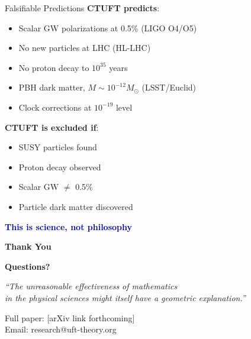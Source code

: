 \documentclass[aspectratio=169]{beamer}
\begin{document}
\begin{frame}{Falsifiable Predictions}
\textbf{CTUFT predicts}:
\begin{itemize}
    \item Scalar GW polarizations at 0.5\% (LIGO O4/O5)
    \item No new particles at LHC (HL-LHC)
    \item No proton decay to $10^{35}$ years
    \item PBH dark matter, $M \sim 10^{-12} M_\odot$ (LSST/Euclid)
    \item Clock corrections at $10^{-19}$ level
\end{itemize}

\vspace{0.5cm}

\textbf{CTUFT is excluded if}:
\begin{itemize}
    \item SUSY particles found
    \item Proton decay observed
    \item Scalar GW $\neq$ 0.5\%
    \item Particle dark matter discovered
\end{itemize}

\vspace{0.5cm}
\begin{center}
\textcolor{darkblue}{\textbf{This is science, not philosophy}}
\end{center}
\end{frame}

\begin{frame}
\begin{center}
\Huge
\textbf{Thank You}

\vspace{1cm}

\normalsize
\textbf{Questions?}

\vspace{1cm}

\textit{``The unreasonable effectiveness of mathematics\\
in the physical sciences might itself have a geometric explanation.''}

\vspace{0.5cm}

\small
Full paper: [arXiv link forthcoming]\\
Email: research@uft-theory.org
\end{center}
\end{frame}
\end{document}

